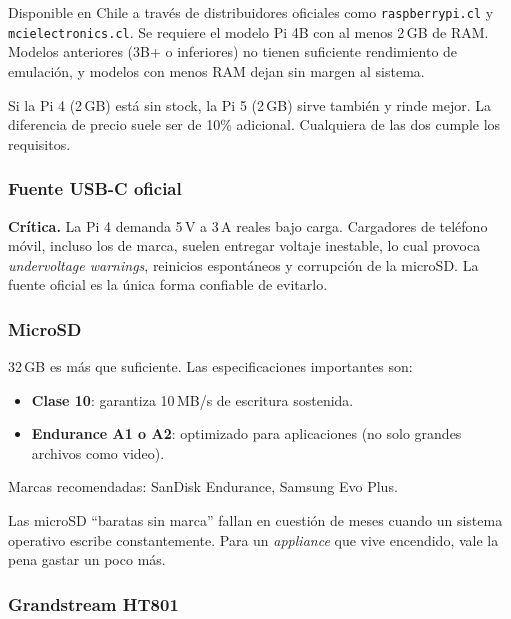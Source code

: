 Disponible en Chile a través de distribuidores oficiales como \texttt{raspberrypi.cl} y \texttt{mcielectronics.cl}. Se requiere el modelo Pi 4B con al menos 2\,GB de RAM. Modelos anteriores (3B+ o inferiores) no tienen suficiente rendimiento de emulación, y modelos con menos RAM dejan sin margen al sistema.

\begin{nota}
Si la Pi 4 (2\,GB) está sin stock, la Pi 5 (2\,GB) sirve también y rinde mejor. La diferencia de precio suele ser de 10\% adicional. Cualquiera de las dos cumple los requisitos.
\end{nota}

\subsubsection{Fuente USB-C oficial}

\textbf{Crítica.} La Pi 4 demanda 5\,V a 3\,A reales bajo carga. Cargadores de teléfono móvil, incluso los de marca, suelen entregar voltaje inestable, lo cual provoca \emph{undervoltage warnings}, reinicios espontáneos y corrupción de la microSD. La fuente oficial es la única forma confiable de evitarlo.

\subsubsection{MicroSD}

32\,GB es más que suficiente. Las especificaciones importantes son:

\begin{itemize}
  \item \textbf{Clase 10}: garantiza 10\,MB/s de escritura sostenida.
  \item \textbf{Endurance A1 o A2}: optimizado para aplicaciones (no solo grandes archivos como video).
\end{itemize}

Marcas recomendadas: SanDisk Endurance, Samsung Evo Plus.

\begin{tip}
Las microSD ``baratas sin marca'' fallan en cuestión de meses cuando un sistema operativo escribe constantemente. Para un \emph{appliance} que vive encendido, vale la pena gastar un poco más.
\end{tip}

\subsubsection{Grandstream HT801}

